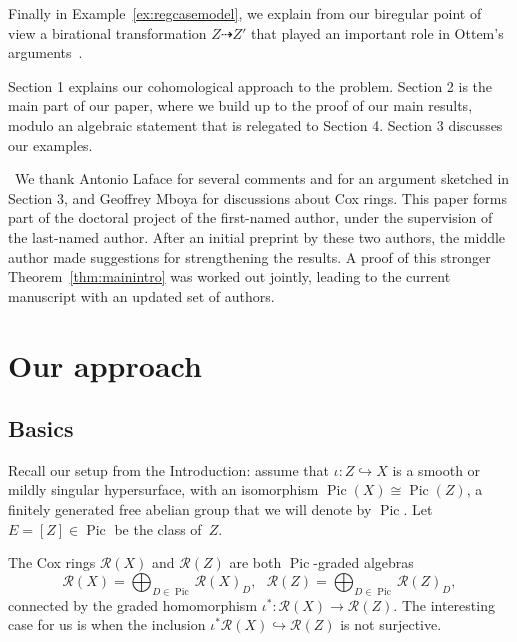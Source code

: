 \documentclass[a4paper,11pt]{amsart}
\theoremstyle{plain}
\theoremstyle{definition}
\newcommand{\R}{\mathcal{R}}
\DeclareMathOperator{\Pic}{Pic}
\newcommand{\pic}{\Pic}
\begin{document}
Finally in Example~\ref{ex:regcasemodel}, we explain from our biregular point of view a birational transformation $Z\dashrightarrow Z'$ that played an important role in Ottem's arguments~\cite[Section 2]{ottem}.

Section 1 explains our cohomological approach to the problem. Section 2 is the main part of our paper, where we build up to the proof of our main results, modulo an algebraic statement that is relegated to Section 4. Section 3 discusses our examples.

\medskip

 \ We thank Antonio Laface for several comments and for an argument sketched in Section 3, %
and Geoffrey Mboya for discussions about Cox rings. This paper forms part of the doctoral project of the first-named author, under the supervision of the last-named author. After an initial preprint by these two authors, the middle author made suggestions for strengthening the results. A proof of this stronger Theorem~\ref{thm:mainintro} was worked out jointly, leading to the current manuscript with an updated set of authors. 

\section{Our approach}
\subsection{Basics}

Recall our setup from the Introduction: assume that $\iota\colon Z\hookrightarrow X$ is a smooth or mildly singular hypersurface, with an isomorphism $\Pic(X)\cong\Pic(Z)$, a finitely generated free abelian group that we will denote by $\pic$. 
Let $E=[Z]\in \pic$ be the class of~$Z$. 

The Cox rings $\R(X)$ and $\R(Z)$ are both $\pic$-graded algebras
\[\R(X) = \bigoplus_{D\in\Pic} \R(X)_D, \ \ \ \R(Z) = \bigoplus_{D\in\Pic} \R(Z)_D, \]
connected by the graded homomorphism $\iota^*\colon \R(X)\rightarrow \R(Z)$. 
The interesting case for us is when the inclusion $\iota^*\R(X)\hookrightarrow \R(Z)$ is not surjective. 
\end{document}
